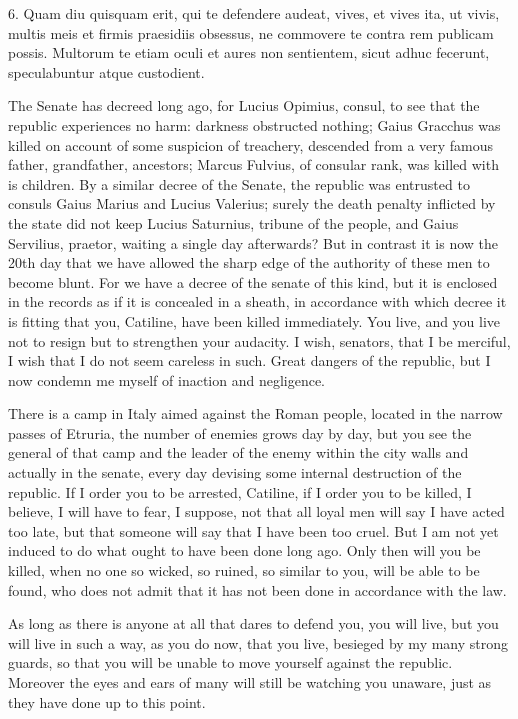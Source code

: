 {  %
  6. Quam diu quisquam erit, qui te defendere audeat, vives, et vives ita, ut vivis, multis meis et firmis praesidiis obsessus, ne commovere te contra rem publicam possis. Multorum te etiam oculi et aures non sentientem, sicut adhuc fecerunt, speculabuntur atque custodient.
}{
  The Senate has decreed long ago, for Lucius Opimius, consul, to see that the republic experiences no harm: darkness obstructed nothing; Gaius Gracchus was killed on account of some suspicion of treachery, descended from a very famous father, grandfather, ancestors; Marcus Fulvius, of consular rank, was killed with is children. By a similar decree of the Senate, the republic was entrusted to consuls Gaius Marius and Lucius Valerius; surely the death penalty inflicted by the state did not keep Lucius Saturnius, tribune of the people, and Gaius Servilius, praetor, waiting a single day afterwards? But in contrast it is now the 20th day that we have allowed the sharp edge of the authority of these men to become blunt. For we have a decree of the senate of this kind, but it is enclosed in the records as if it is concealed in a sheath, in accordance with which decree it is fitting that you, Catiline, have been killed immediately. You live, and you live not to resign but to strengthen your audacity. I wish, senators, that I be merciful, I wish that I do not seem careless in such. Great dangers of the republic, but I now condemn me myself of inaction and negligence.

  There is a camp in Italy aimed against the Roman people, located in the narrow passes of Etruria, the number of enemies grows day by day, but you see the general of that camp and the leader of the enemy within the city walls and actually in the senate, every day devising some internal destruction of the republic. If I order you to be arrested, Catiline, if I order you to be killed, I believe, I will have to fear, I suppose, not that all loyal men will say I have acted too late, but that someone will say that I have been too cruel. But I am not yet induced to do what ought to have been done long ago. Only then will you be killed, when no one so wicked, so ruined, so similar to you, will be able to be found, who does not admit that it has not been done in accordance with the law.

  As long as there is anyone at all that dares to defend you, you will live, but you will live in such a way, as you do now, that you live, besieged by my many strong guards, so that you will be unable to move yourself against the republic. Moreover the eyes and ears of many will still be watching you unaware, just as they have done up to this point.
}
